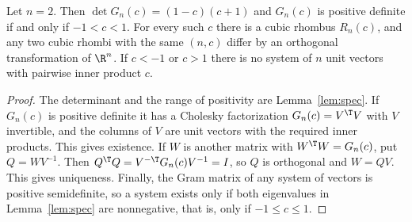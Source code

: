 \begin{theorem}\label{thm:main}
Let $n=2$. Then $\det G_n(c)=\left(1 - c\right) \left(c + 1\right)$ and $G_n(c)$ is positive definite if and only if $-1<c<1$.
For every such $c$ there is a cubic rhombus $R_n(c)$, and any two cubic rhombi with the same $(n,c)$ differ by an orthogonal transformation of $\R^n$.
If $c<-1$ or $c>1$ there is no system of $n$ unit vectors with pairwise inner product $c$.
\end{theorem}
\begin{proof}
The determinant and the range of positivity are Lemma~\ref{lem:spec}.
If $G_n(c)$ is positive definite it has a Cholesky factorization $G_n(c)=V^\T V$ with $V$ invertible, and the columns of $V$ are unit vectors with the required inner products. This gives existence.
If $W$ is another matrix with $W^\T W=G_n(c)$, put $Q=WV^{-1}$. Then $Q^\T Q=V^{-\T}G_n(c)V^{-1}=I$, so $Q$ is orthogonal and $W=QV$. This gives uniqueness.
Finally, the Gram matrix of any system of vectors is positive semidefinite, so a system exists only if both eigenvalues in Lemma~\ref{lem:spec} are nonnegative, that is, only if $-1\le c\le1$.
\end{proof}
